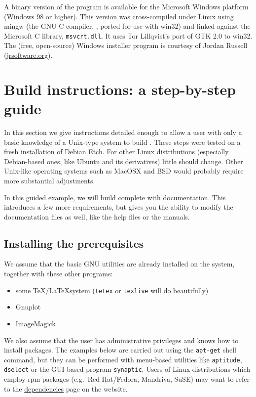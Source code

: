 A binary version of the program is available for the Microsoft Windows
platform (Windows 98 or higher). This version was cross-compiled under
Linux using mingw (the GNU C compiler, , ported for use with
win32) and linked against the Microsoft C library, \verb+msvcrt.dll+.
It uses Tor Lillqvist's port of GTK 2.0 to win32.  The (free,
open-source) Windows installer program is courtesy of Jordan Russell
(\href{http://www.jrsoftware.org/}{jrsoftware.org}).

\section{Build instructions: a step-by-step guide}
\label{sec:build-inst}

In this section we give instructions detailed enough to allow a user
with only a basic knowledge of a Unix-type system to build .
These steps were tested on a fresh installation of Debian Etch. For
other Linux distributions (especially Debian-based ones, like Ubuntu
and its derivatives) little should change. Other Unix-like operating
systems such as MacOSX and BSD would probably require more substantial
adjustments.

In this guided example, we will build  complete with
documentation.  This introduces a few more requirements, but gives you
the ability to modify the documentation files as well, like the help
files or the manuals.

\subsection{Installing the prerequisites}

We assume that the basic GNU utilities are already installed on the
system, together with these other programs:
\begin{itemize}
\item some \TeX/\LaTeX system (\texttt{tetex} or \texttt{texlive} will
  do beautifully)
\item Gnuplot
\item ImageMagick
\end{itemize}
We also assume that the user has administrative privileges and knows
how to install packages.  The examples below are carried out using the
\texttt{apt-get} shell command, but they can be performed with
menu-based utilities like \texttt{aptitude}, \texttt{dselect} or the
GUI-based program \texttt{synaptic}. Users of Linux distributions
which employ rpm packages (e.g.\ Red Hat/Fedora, Mandriva, SuSE) may
want to refer to the
\href{http://gretl.sourceforge.net/depend.html}{dependencies} page on
the  website.

